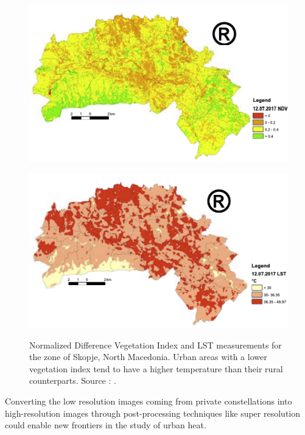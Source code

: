     \begin{figure}[H]
        \centering
        \begin{minipage}{0.5\textwidth}
            \centering
            \includegraphics[width=\textwidth]{Includes/1-skopje-NDVI.png}
            \label{fig:1-skopje-NDVI}
        \end{minipage}\hfill
        \begin{minipage}{0.5\textwidth}
            \centering
            \includegraphics[width=\textwidth]{Includes/1-skopje-LST.png}
            \label{fig:1-skopje-LST}
        \end{minipage}
        \caption{Normalized Difference Vegetation Index \cite{Rouse1973MonitoringVS} and LST measurements for the zone of Skopje, North Macedonia. Urban areas with a lower vegetation index tend to have a higher temperature than their rural counterparts. Source : \cite{skopje2018}.} 
        \label{fig:1-skopie-UHI}
    \end{figure}

    Converting the low resolution images coming from private constellations into high-resolution images through post-processing techniques like super resolution could enable new frontiers in the study of urban heat. 


